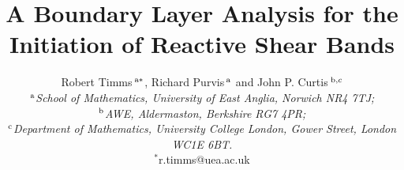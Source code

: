 \documentclass[11pt]{article}
\title{\vspace{-4ex}\textbf{A Boundary Layer Analysis for the Initiation of Reactive Shear Bands}}
\date{}
\author{\vspace{1ex}Robert Timms$\,^{\text a *}$, Richard Purvis$\,^{\text a}$ and John P. Curtis$\,^{\text b,c}$ \\  {\em  $^{\text a}$School of Mathematics, University of East Anglia, Norwich NR4 7TJ;}\\ {\em $^{\text b}$AWE, Aldermaston, Berkshire RG7 4PR;} \\{\em $^{\text c}$Department of Mathematics, University College London, Gower Street, London WC1E 6BT.} \\ \vspace{1ex}$^{*}$r.timms@uea.ac.uk}
\begin{document}

%

\begin{figure}[tbp]
\centering
\setlength\figureheight{2.85cm}      
\setlength\figurewidth{3cm}

\end{figure}

%

%
\end{document}
